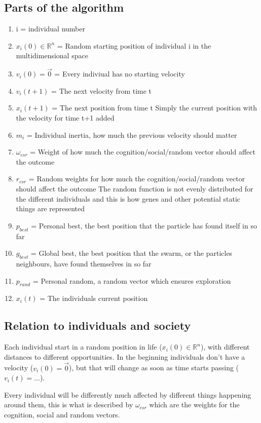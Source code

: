 \documentclass[28pt]{article}
\begin{document}
\subsection{Parts of the algorithm}
\begin{enumerate}
  \item i = individual number
  \item $x_i(0) \in \mathbb{R}^n$ = Random starting position of individual i in the multidimensional space
  \item $v_i(0) = \vec{0}$ = Every indiviual has no starting velocity
  \item $v_i(t+1)$ = The next velocity from time t
  \item $x_i(t+1)$ = The next position from time t
    Simply the current position with the velocity for time t+1 added
  \item $m_i$ = Individual inertia, how much the previous velocity should matter
  \item $\omega_{csr}$ = Weight of how much the cognition/social/random vector should affect the outcome
  \item $r_{csr}$ = Random weights for how much the cognition/social/random vector should affect the outcome
    The random function is not evenly distributed for the different individuals and this is how genes and other potential static things are represented
  \item $p_{best}$ = Personal best, the best position that the particle has found itself in so far
  \item $g_{best}$ = Global best, the best position that the swarm, or the particles neighbours, have found themselves in so far
  \item $p_{rand}$ = Personal random, a random vector which ensures exploration
  \item $x_i(t)$ = The individuals current position
\end{enumerate}

\subsection{Relation to individuals and society}
Each individual start in a random position in life ($x_i(0) \in \mathbb{R}^n$), with different distances to different opportunities. 
In the beginning individuals don't have a velocity ($v_i(0) = \vec{0}$), but that will change as soon as time starts passing ($v_i(t) = \ldots$).

Every individual will be differently much affected by different things happening around them, 
this is what is described by $\omega_{csr}$ which are the weights for the cognition, social and random vectors. 
\end{document}

